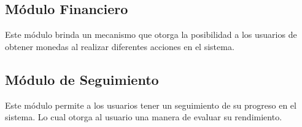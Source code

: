 \subsection*{Módulo Financiero}

 \noindent
 Este módulo brinda un mecanismo que otorga la posibilidad a los usuarios de
 obtener monedas al realizar diferentes acciones en el sistema.





\subsection*{Módulo de Seguimiento}

 \noindent
 Este módulo permite a los usuarios tener un seguimiento de su progreso en el sistema.
 Lo cual otorga al usuario una manera de evaluar su rendimiento.


%

